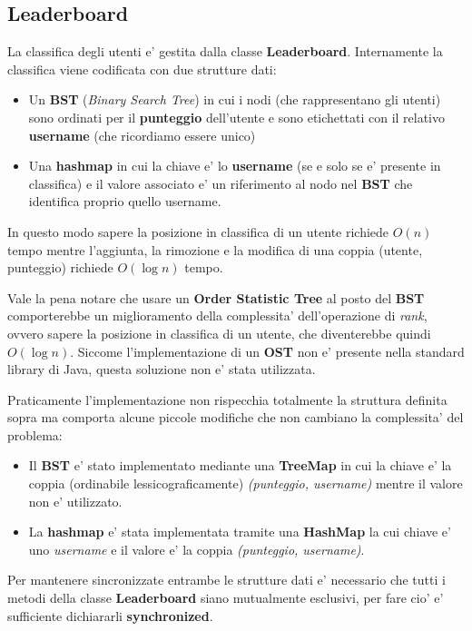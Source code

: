 \subsection{Leaderboard}

La classifica degli utenti e' gestita dalla classe \textbf{Leaderboard}. Internamente la classifica viene codificata con due strutture dati:
\begin{itemize}
	\item Un \textbf{BST} (\emph{Binary Search Tree}) in cui i nodi (che rappresentano gli utenti) sono ordinati per il \textbf{punteggio} dell'utente e sono etichettati con il relativo \textbf{username} (che ricordiamo essere unico)
	\item Una \textbf{hashmap} in cui la chiave e' lo \textbf{username} (se e solo se e' presente in classifica) e il valore associato e' un riferimento al nodo nel \textbf{BST} che identifica proprio quello username.
\end{itemize}
In questo modo sapere la posizione in classifica di un utente richiede $O(n)$ tempo mentre l'aggiunta, la rimozione e la modifica di una coppia (utente, punteggio) richiede $O(\log{n})$ tempo.

Vale la pena notare che usare un \textbf{Order Statistic Tree} al posto del \textbf{BST} comporterebbe un miglioramento della complessita' dell'operazione di \emph{rank}, ovvero sapere la posizione in classifica di un utente, che diventerebbe quindi $O(\log{n})$. Siccome l'implementazione di un \textbf{OST} non e' presente nella standard library di Java, questa soluzione non e' stata utilizzata.

Praticamente l'implementazione non rispecchia totalmente la struttura definita sopra ma comporta alcune piccole modifiche che non cambiano la complessita' del problema:
\begin{itemize}
	\item Il \textbf{BST} e' stato implementato mediante una \textbf{TreeMap} in cui la chiave e' la coppia (ordinabile lessicograficamente) \emph{(punteggio, username)} mentre il valore non e' utilizzato.
	\item La \textbf{hashmap} e' stata implementata tramite una \textbf{HashMap} la cui chiave e' uno \emph{username} e il valore e' la coppia \emph{(punteggio, username)}.
\end{itemize}
Per mantenere sincronizzate entrambe le strutture dati e' necessario che tutti i metodi della classe \textbf{Leaderboard} siano mutualmente esclusivi, per fare cio' e' sufficiente dichiararli \textbf{synchronized}.

